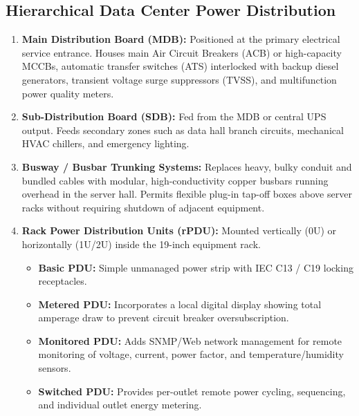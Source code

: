 \subsection{Hierarchical Data Center Power Distribution}
\begin{enumerate}[leftmargin=*]
    \item \textbf{Main Distribution Board (MDB):} Positioned at the primary electrical service entrance. Houses main Air Circuit Breakers (ACB) or high-capacity MCCBs, automatic transfer switches (ATS) interlocked with backup diesel generators, transient voltage surge suppressors (TVSS), and multifunction power quality meters.
    \item \textbf{Sub-Distribution Board (SDB):} Fed from the MDB or central UPS output. Feeds secondary zones such as data hall branch circuits, mechanical HVAC chillers, and emergency lighting.
    \item \textbf{Busway / Busbar Trunking Systems:} Replaces heavy, bulky conduit and bundled cables with modular, high-conductivity copper busbars running overhead in the server hall. Permits flexible plug-in tap-off boxes above server racks without requiring shutdown of adjacent equipment.
    \item \textbf{Rack Power Distribution Units (rPDU):} Mounted vertically (0U) or horizontally (1U/2U) inside the 19-inch equipment rack.
    \begin{itemize}
        \item \textbf{Basic PDU:} Simple unmanaged power strip with IEC C13 / C19 locking receptacles.
        \item \textbf{Metered PDU:} Incorporates a local digital display showing total amperage draw to prevent circuit breaker oversubscription.
        \item \textbf{Monitored PDU:} Adds SNMP/Web network management for remote monitoring of voltage, current, power factor, and temperature/humidity sensors.
        \item \textbf{Switched PDU:} Provides per-outlet remote power cycling, sequencing, and individual outlet energy metering.
    \end{itemize}
\end{enumerate}

